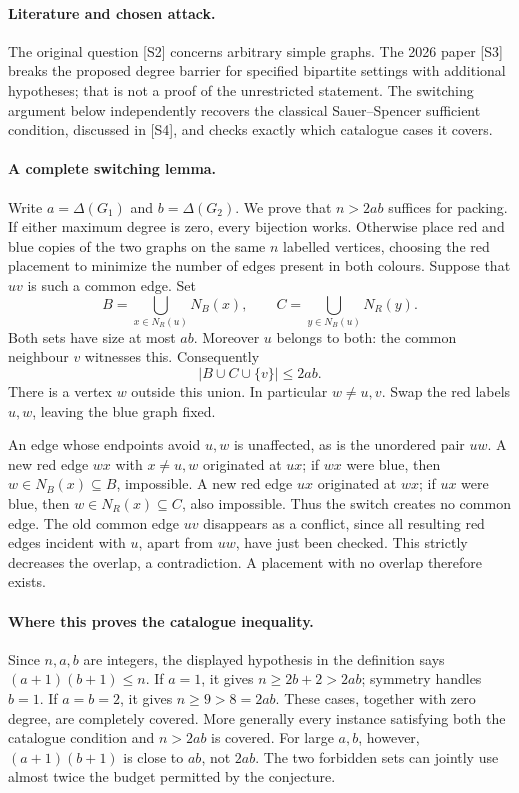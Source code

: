 \documentclass[11pt,a4paper]{article}
\begin{document}
\paragraph{Literature and chosen attack.}
The original question [S2] concerns arbitrary simple graphs. The 2026 paper [S3] breaks the proposed degree barrier for specified bipartite settings with additional hypotheses; that is not a proof of the unrestricted statement. The switching argument below independently recovers the classical Sauer--Spencer sufficient condition, discussed in [S4], and checks exactly which catalogue cases it covers.

\paragraph{A complete switching lemma.}
Write $a=\Delta(G_1)$ and $b=\Delta(G_2)$. We prove that $n>2ab$ suffices for packing. If either maximum degree is zero, every bijection works. Otherwise place red and blue copies of the two graphs on the same $n$ labelled vertices, choosing the red placement to minimize the number of edges present in both colours. Suppose that $uv$ is such a common edge. Set
\[
 B=\bigcup_{x\in N_R(u)}N_B(x),\qquad
 C=\bigcup_{y\in N_B(u)}N_R(y).
\]
Both sets have size at most $ab$. Moreover $u$ belongs to both: the common neighbour $v$ witnesses this. Consequently
\[
 |B\cup C\cup\{v\}|\le 2ab.
\]
There is a vertex $w$ outside this union. In particular $w\ne u,v$. Swap the red labels $u,w$, leaving the blue graph fixed.

An edge whose endpoints avoid $u,w$ is unaffected, as is the unordered pair $uw$. A new red edge $wx$ with $x\ne u,w$ originated at $ux$; if $wx$ were blue, then $w\in N_B(x)\subseteq B$, impossible. A new red edge $ux$ originated at $wx$; if $ux$ were blue, then $w\in N_R(x)\subseteq C$, also impossible. Thus the switch creates no common edge. The old common edge $uv$ disappears as a conflict, since all resulting red edges incident with $u$, apart from $uw$, have just been checked. This strictly decreases the overlap, a contradiction. A placement with no overlap therefore exists.

\paragraph{Where this proves the catalogue inequality.}
Since $n,a,b$ are integers, the displayed hypothesis in the definition says $(a+1)(b+1)\le n$. If $a=1$, it gives $n\ge2b+2>2ab$; symmetry handles $b=1$. If $a=b=2$, it gives $n\ge9>8=2ab$. These cases, together with zero degree, are completely covered. More generally every instance satisfying both the catalogue condition and $n>2ab$ is covered. For large $a,b$, however, $(a+1)(b+1)$ is close to $ab$, not $2ab$. The two forbidden sets can jointly use almost twice the budget permitted by the conjecture.
\end{document}
